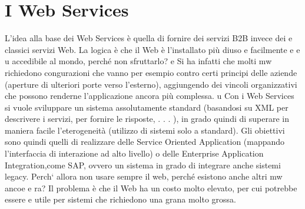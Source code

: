 \documentclass[a4paper,12pt]{article}
\begin{document}
\section{I Web Services}
L'idea alla base dei Web Services è quella di fornire dei servizi B2B invece dei
e
classici servizi Web. La logica è che il Web è l'installato più diuso e facilmente
e
e
u
accedibile al mondo, perché non sfruttarlo?
e
Si ha infatti che molti mw richiedono congurazioni che vanno per esempio
contro certi principi delle aziende (aperture di ulteriori porte verso l'esterno),
aggiungendo dei vincoli organizzativi che possono renderne l'applicazione ancora
più complessa.
u
Con i Web Services si vuole sviluppare un sistema assolutamente standard
(basandosi su XML per descrivere i servizi, per fornire le risposte, . . . ), in grado quindi di superare in maniera
facile l'eterogeneità (utilizzo di sistemi solo
a
standard). Gli obiettivi sono quindi quelli di realizzare delle Service Oriented
Application (mappando l'interfaccia di interazione ad alto livello) o delle Enterprise Application Integration,come SAP,
ovvero un sistema in grado di integrare
anche sistemi legacy.
Perch` allora non usare sempre il web, perché esistono anche altri mw ancoe
e
ra? Il problema è che il Web ha un costo molto elevato, per cui potrebbe essere
e
utile per sistemi che richiedono una grana molto grossa.
\end{document}
